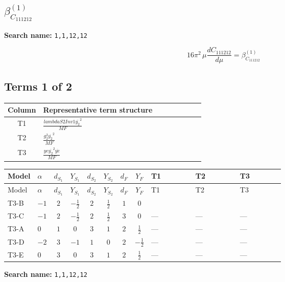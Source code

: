 \documentclass[8pt]{article}
\begin{document}
\begin{landscape}
\section*{$\beta_{C_{111212}}^{(1)}$}
\noindent\textbf{Search name: }\texttt{1,1,12,12}\par\smallskip
\[16\pi^2\,\mu\frac{d C_{111212}}{d\mu}=\beta_{C_{111212}}^{(1)}\]
\subsection*{Terms 1 of 2}
\begin{center}
\begin{tabular}{@{}c >{\raggedright\arraybackslash}p{0.82\linewidth}@{}}
\toprule
Column & Representative term structure \\
\midrule
T1 & \(\displaystyle \frac{lambdaS2Inv1 \overline{y_{2}}^{2}}{MF}\) \\
\midrule
T2 & \(\displaystyle \frac{g_{2}^{2} \overline{y_{2}}^{2}}{MF}\) \\
\midrule
T3 & \(\displaystyle \frac{ye \overline{y_{2}}^{2} \overline{ye}}{MF}\) \\
\midrule
\bottomrule
\end{tabular}
\end{center}
\smallskip
\tiny
\begin{longtable}{@{}llcccccc >{\raggedright\arraybackslash}p{0.21\linewidth} >{\raggedright\arraybackslash}p{0.21\linewidth} >{\raggedright\arraybackslash}p{0.21\linewidth}@{}}
\toprule
Model & $\alpha$ & $d_{S_1}$ & $Y_{S_1}$ & $d_{S_2}$ & $Y_{S_2}$ & $d_F$ & $Y_F$ & T1 & T2 & T3 \\
\midrule
\endfirsthead
\toprule
Model & $\alpha$ & $d_{S_1}$ & $Y_{S_1}$ & $d_{S_2}$ & $Y_{S_2}$ & $d_F$ & $Y_F$ & T1 & T2 & T3 \\
\midrule
\endhead
T3-B & $-1$ & $2$ & $-\frac{1}{2}$ & $2$ & $\frac{1}{2}$ & $1$ & $0$ & \scriptsize\adjustbox{max width=\linewidth}{$\begin{gathered} \frac{lambdaS2Inv1 \overline{y_{2}}^{2}}{2 MF}\end{gathered}$} & \scriptsize\adjustbox{max width=\linewidth}{$\begin{gathered} \frac{3 g_{2}^{2} \overline{y_{2}}^{2}}{4 MF}\end{gathered}$} & \scriptsize\adjustbox{max width=\linewidth}{$\begin{gathered} - \frac{ye \overline{y_{2}}^{2} \overline{ye}}{4 MF}\end{gathered}$} \\
\midrule
T3-C & $-1$ & $2$ & $-\frac{1}{2}$ & $2$ & $\frac{1}{2}$ & $3$ & $0$ & --- & --- & --- \\
\midrule
T3-A & $0$ & $1$ & $0$ & $3$ & $1$ & $2$ & $\frac{1}{2}$ & --- & --- & --- \\
\midrule
T3-D & $-2$ & $3$ & $-1$ & $1$ & $0$ & $2$ & $-\frac{1}{2}$ & --- & --- & --- \\
\midrule
T3-E & $0$ & $3$ & $0$ & $3$ & $1$ & $2$ & $\frac{1}{2}$ & --- & --- & --- \\
\midrule
\bottomrule
\end{longtable}
\clearpage
\noindent\textbf{Search name: }\texttt{1,1,12,12}\par\smallskip

\end{landscape}
\end{document}
